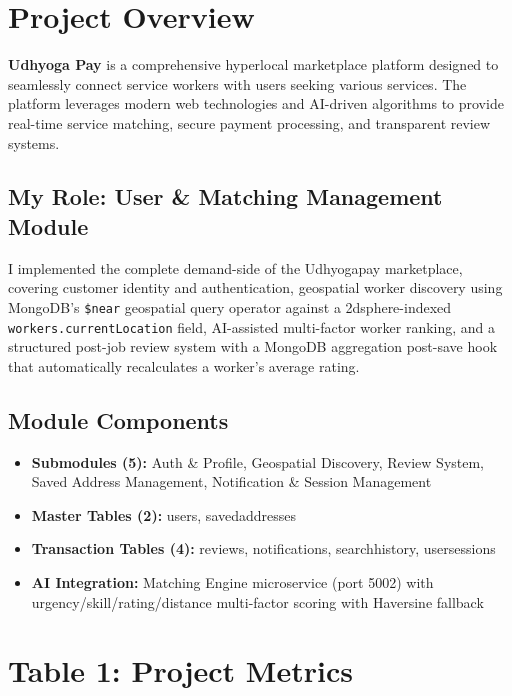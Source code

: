 \documentclass[12pt,a4paper]{article}
\begin{document}
\newpage

\section*{Project Overview}

\textbf{Udhyoga Pay} is a comprehensive hyperlocal marketplace platform designed to seamlessly connect service workers with users seeking various services. The platform leverages modern web technologies and AI-driven algorithms to provide real-time service matching, secure payment processing, and transparent review systems.

\subsection*{My Role: User \& Matching Management Module}
I implemented the complete demand-side of the Udhyogapay marketplace, covering customer identity and authentication, geospatial worker discovery using MongoDB's \texttt{\$near} geospatial query operator against a 2dsphere-indexed \texttt{workers.currentLocation} field, AI-assisted multi-factor worker ranking, and a structured post-job review system with a MongoDB aggregation post-save hook that automatically recalculates a worker's average rating.

\subsection*{Module Components}
\begin{itemize}[leftmargin=*]
    \item \textbf{Submodules (5):} Auth \& Profile, Geospatial Discovery, Review System, Saved Address Management, Notification \& Session Management
    \item \textbf{Master Tables (2):} users, savedaddresses
    \item \textbf{Transaction Tables (4):} reviews, notifications, searchhistory, usersessions
    \item \textbf{AI Integration:} Matching Engine microservice (port 5002) with urgency/skill/rating/distance multi-factor scoring with Haversine fallback
\end{itemize}

\vspace{0.3cm}

\section*{Table 1: Project Metrics}
\end{document}
